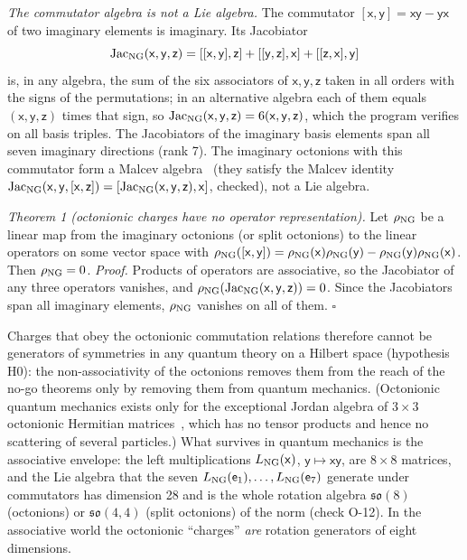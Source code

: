 \emph{The commutator algebra is not a Lie algebra.} The commutator $[\mathsf x,\mathsf y]=\mathsf x\mathsf y-
\mathsf y\mathsf x$ of two imaginary elements is imaginary. Its Jacobiator
\begin{equation}
\mathrm{Jac}_{\rm NG}(\mathsf x,\mathsf y,\mathsf z)=[[\mathsf x,\mathsf y],\mathsf z]+[[\mathsf y,\mathsf z],\mathsf x]+[[\mathsf z,\mathsf x],\mathsf y]
\label{eq:jacobiator}
\end{equation}
is, in any algebra, the sum of the six associators of $\mathsf x,\mathsf y,\mathsf z$ taken in all orders
with the signs of the permutations; in an alternative algebra each of them equals $(\mathsf x,\mathsf y,\mathsf z)$
times that sign, so $\mathrm{Jac}_{\rm NG}(\mathsf x,\mathsf y,\mathsf z)=6(\mathsf x,\mathsf y,\mathsf z)$, which the program verifies
on all basis triples. The Jacobiators of the imaginary basis elements span all seven imaginary
directions (rank 7). The imaginary octonions with this commutator form a Malcev
algebra~\cite{Malcev1955} (they satisfy the Malcev identity $\mathrm{Jac}_{\rm NG}(\mathsf x,\mathsf y,[\mathsf x,\mathsf z])=
[\mathrm{Jac}_{\rm NG}(\mathsf x,\mathsf y,\mathsf z),\mathsf x]$, checked), not a Lie algebra.

\emph{Theorem 1 (octonionic charges have no operator representation).} Let $\rho_{\rm NG}$ be a linear
map from the imaginary octonions (or split octonions) to the linear operators on some vector space
with $\rho_{\rm NG}([\mathsf x,\mathsf y])=\rho_{\rm NG}(\mathsf x)\rho_{\rm NG}(\mathsf y)-\rho_{\rm NG}(\mathsf y)
\rho_{\rm NG}(\mathsf x)$. Then $\rho_{\rm NG}=0$.
\emph{Proof.} Products of operators are associative, so the Jacobiator of any three operators
vanishes, and $\rho_{\rm NG}(\mathrm{Jac}_{\rm NG}(\mathsf x,\mathsf y,\mathsf z))=0$. Since the Jacobiators span all imaginary
elements, $\rho_{\rm NG}$ vanishes on all of them. $\square$

Charges that obey the octonionic commutation relations therefore cannot be generators of
symmetries in any quantum theory on a Hilbert space (hypothesis H0): the non-associativity of the
octonions removes them from the reach of the no-go theorems only by removing them from quantum
mechanics. (Octonionic quantum mechanics exists only for the exceptional Jordan algebra of $3\times3$
octonionic Hermitian matrices~\cite{JordanNeumannWigner1934,GunaydinPironRuegg1978}, which has no
tensor products and hence no scattering of several particles.) What survives in quantum mechanics
is the associative envelope: the left multiplications $L_{\rm NG}(\mathsf x)$, $\mathsf y\mapsto\mathsf x\mathsf y$,
are $8\times8$ matrices, and the Lie algebra that the seven $L_{\rm NG}(\mathsf e_1),\dots,
L_{\rm NG}(\mathsf e_7)$ generate under commutators has dimension 28 and is the whole rotation algebra
$\mathfrak{so}(8)$ (octonions) or $\mathfrak{so}(4,4)$ (split octonions) of the norm (check O-12). In the
associative world the octonionic ``charges'' \emph{are} rotation generators of eight dimensions.

